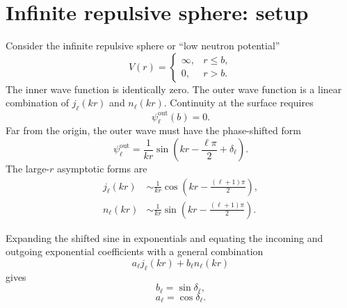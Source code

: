\section{Infinite repulsive sphere: setup}
Consider the infinite repulsive sphere or ``low neutron potential''
\[
  V(r)=
  \begin{cases}
    \infty, & r\le b,\\
    0, & r>b.
  \end{cases}
\]
The inner wave function is identically zero.  The outer wave function is a linear combination of $j_\ell(kr)$ and $n_\ell(kr)$.  Continuity at the surface requires
\[
  \psi_\ell^{\mathrm{out}}(b)=0.
\]
Far from the origin, the outer wave must have the phase-shifted form
\begin{equation*}
  \psi_\ell^{\mathrm{out}}
  =\frac{1}{kr}\sin\left(kr-\frac{\ell\pi}{2}+\delta_\ell\right).
  \tag{11}
\end{equation*}
The large-$r$ asymptotic forms are
\begin{align*}
  j_\ell(kr)&\sim \frac{1}{kr}\cos\left(kr-\frac{(\ell+1)\pi}{2}\right),\\
  n_\ell(kr)&\sim \frac{1}{kr}\sin\left(kr-\frac{(\ell+1)\pi}{2}\right).
  \tag{12}
\end{align*}

Expanding the shifted sine in exponentials and equating the incoming and outgoing exponential coefficients with a general combination
\[
  a_\ell j_\ell(kr)+b_\ell n_\ell(kr)
\]
gives
\begin{equation*}
  b_\ell=\sin\delta_\ell,
  \tag{15}
\end{equation*}
\begin{equation*}
  a_\ell=\cos\delta_\ell.
  \tag{16}
\end{equation*}

